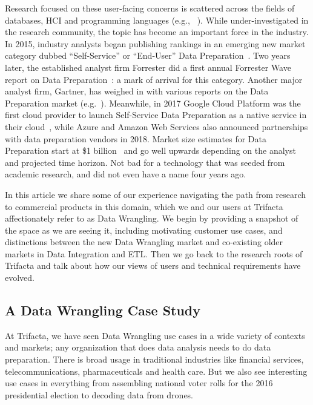 \documentclass[11pt]{article}
\begin{document}
Research focused on these user-facing concerns is scattered across the fields of databases, HCI and programming languages (e.g., ~\cite{galhardas2000ajax,raman2001potter,hernandez2001clio,mandelbaum2007pads,kandel2011wrangler,gulwani2011automating,jin2017foofah}). While under-investigated in the research community, the topic has become an important force in the industry. In 2015, industry analysts began publishing rankings in an emerging new market category dubbed ``Self-Service'' or ``End-User'' Data Preparation~\cite{dresner, bloor}. Two years later, the established analyst firm Forrester did a first annual Forrester Wave report on Data Preparation~\cite{forrester-wave}: a mark of arrival for this category. Another major analyst firm, Gartner, has weighed in with various reports on the Data Preparation market (e.g.~\cite{gartner-marketguide-2017, gartner-peer-insights}). Meanwhile, in 2017 Google Cloud Platform was the first cloud provider to launch Self-Service Data Preparation as a native service in their cloud~\cite{novet-dataprep}, while Azure and Amazon Web Services also announced partnerships with data preparation vendors in 2018.  Market size estimates for Data Preparation start at \$1 billion~\cite{gartner-marketguide-2017} and go well upwards depending on the analyst and projected time horizon. Not bad for a technology that was seeded from academic research, and did not even have a name four years ago.

\pagebreak
In this article we share some of our experience navigating the path from research to commercial products in this domain, which we and our users at Trifacta affectionately refer to as Data Wrangling. 
We begin by providing a snapshot of the space as we are seeing it, including motivating customer use cases, and distinctions between the new Data Wrangling market and co-existing older markets in Data Integration and ETL. Then we go back to the research roots of Trifacta and talk about how our views of users and technical requirements have evolved.

\subsection{A Data Wrangling Case Study}
\label{sec:casestudy}
At Trifacta, we have seen Data Wrangling use cases in a wide variety of contexts and markets; any organization that does data analysis needs to do data preparation. There is broad usage in traditional industries like financial services, telecommunications, pharmaceuticals and health care. But we also see interesting use cases in everything from assembling national voter rolls for the 2016 presidential election %
to decoding data from drones. %
\end{document}
